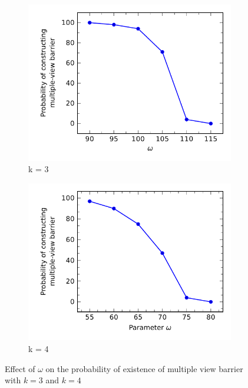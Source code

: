 %
\begin{figure}[h]
	\begin{subfigure}[t]{.5\textwidth}
		\centering
		\includegraphics[scale=.8]{Hinhanh/OmegaEffect/probability/k3.pdf}		
		\caption{k = 3}
	\end{subfigure}
	\begin{subfigure}[t]{.5\textwidth}
		\centering
		\includegraphics[scale=.8]{Hinhanh/OmegaEffect/probability/k4.pdf}		
		\caption{k = 4}
	\end{subfigure}
\caption{Effect of $\omega$ on the probability of existence of multiple view barrier with $k = 3$ and $k = 4$}
\label{fig:}
\end{figure}

